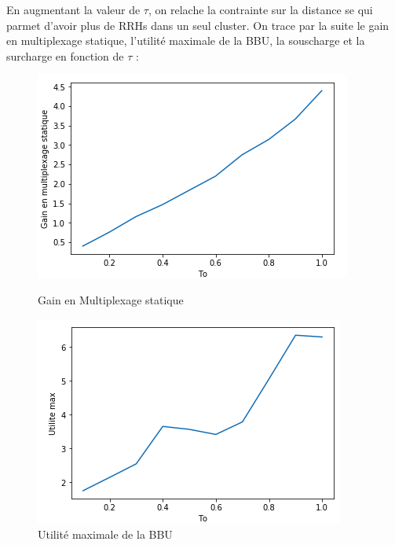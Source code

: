 \documentclass{report}
\begin{document}
En augmentant la valeur de $\tau$, on relache la contrainte sur la distance se qui parmet d'avoir plus de RRHs dans un seul cluster.
On trace par la suite le gain en multiplexage statique, l'utilité maximale de la BBU, la souscharge et la surcharge en fonction de $\tau$ : 
\begin{figure}[H]
  \begin{minipage}{0.4\textwidth}
    \centering
    \includegraphics[scale=0.55]{images/gain_to.png}
    \caption{Gain en Multiplexage statique}\label{Fig:Data1}
  \end{minipage}\hfill
  \begin{minipage}{0.4\textwidth}
    \centering
    \includegraphics[scale=0.55]{images/utilitemax_to.png}
    \caption{Utilité maximale de la BBU}\label{Fig:Data2}
  \end{minipage}
\end{figure} 
\end{document}

